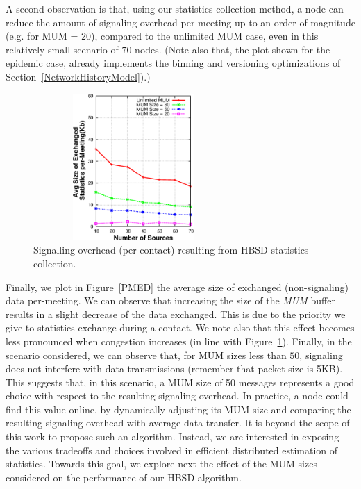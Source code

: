 A second observation is that, using our statistics collection method, a node can reduce the amount of signaling overhead per meeting up to an order of magnitude (e.g. for MUM = 20), compared to the unlimited MUM case, even in this relatively small scenario of $70$ nodes. (Note also that, the plot shown for the epidemic case, already implements the binning and versioning optimizations of Section~\ref{NetworkHistoryModel}).)

\begin{figure}[!h]
\centering
\includegraphics[width=3in,height=2.2in]{Chapitre3/fig7.eps}
\caption{Signalling overhead (per contact) resulting from HBSD statistics collection.}
\label{StatOverhead}
\end{figure}

Finally, we plot in Figure~\ref{PMED} the average size of exchanged (non-signaling) data per-meeting. We can observe that increasing the size of the \emph{MUM} buffer results in a slight decrease of the data exchanged. This is due to the priority we give to statistics exchange during a contact. We note also that this effect becomes less pronounced when congestion increases (in line with Figure~\ref{StatOverhead}). Finally, in the scenario considered, we can observe that, for MUM sizes less than $50$, signaling does not interfere with data transmissions (remember that packet size is 5KB). This suggests that, in this scenario, a MUM size of 50 messages represents a good choice with respect to the resulting signaling overhead. In practice, a node could find this value online, by dynamically adjusting its MUM size and comparing the resulting signaling overhead with average data transfer. It is beyond the scope of this work to propose such an algorithm. Instead, we are interested in exposing the various tradeoffs and choices involved in efficient distributed estimation of statistics. Towards this goal, we explore next the effect of the MUM sizes considered on the performance of our HBSD algorithm.


